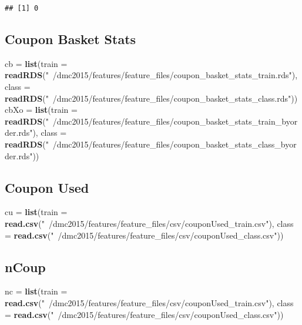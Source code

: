 \documentclass[10pt]{report}
\newenvironment{Shaded}{}{}
\newcommand{\KeywordTok}[1]{\textcolor[rgb]{0.00,0.44,0.13}{\textbf{{#1}}}}
\newcommand{\DataTypeTok}[1]{\textcolor[rgb]{0.56,0.13,0.00}{{#1}}}
\newcommand{\StringTok}[1]{\textcolor[rgb]{0.25,0.44,0.63}{{#1}}}
\newcommand{\NormalTok}[1]{{#1}}
\begin{document}
\begin{verbatim}
## [1] 0
\end{verbatim}

\subsection{Coupon Basket Stats}\label{coupon-basket-stats}

\begin{Shaded}
\begin{Highlighting}[]
\NormalTok{cb =}\StringTok{ }\KeywordTok{list}\NormalTok{(}\DataTypeTok{train =} \KeywordTok{readRDS}\NormalTok{(}\StringTok{"~/dmc2015/features/feature_files/coupon_basket_stats_train.rds"}\NormalTok{), }
    \DataTypeTok{class =} \KeywordTok{readRDS}\NormalTok{(}\StringTok{"~/dmc2015/features/feature_files/coupon_basket_stats_class.rds"}\NormalTok{))}
\NormalTok{cbXo =}\StringTok{ }\KeywordTok{list}\NormalTok{(}\DataTypeTok{train =} \KeywordTok{readRDS}\NormalTok{(}\StringTok{"~/dmc2015/features/feature_files/coupon_basket_stats_train_byorder.rds"}\NormalTok{), }
    \DataTypeTok{class =} \KeywordTok{readRDS}\NormalTok{(}\StringTok{"~/dmc2015/features/feature_files/coupon_basket_stats_class_byorder.rds"}\NormalTok{))}
\end{Highlighting}
\end{Shaded}

\subsection{Coupon Used}\label{coupon-used}

\begin{Shaded}
\begin{Highlighting}[]
\NormalTok{cu =}\StringTok{ }\KeywordTok{list}\NormalTok{(}\DataTypeTok{train =} \KeywordTok{read.csv}\NormalTok{(}\StringTok{"~/dmc2015/features/feature_files/csv/couponUsed_train.csv"}\NormalTok{), }
    \DataTypeTok{class =} \KeywordTok{read.csv}\NormalTok{(}\StringTok{"~/dmc2015/features/feature_files/csv/couponUsed_class.csv"}\NormalTok{))}
\end{Highlighting}
\end{Shaded}

\subsection{nCoup}\label{ncoup}

\begin{Shaded}
\begin{Highlighting}[]
\NormalTok{nc =}\StringTok{ }\KeywordTok{list}\NormalTok{(}\DataTypeTok{train =} \KeywordTok{read.csv}\NormalTok{(}\StringTok{"~/dmc2015/features/feature_files/csv/couponUsed_train.csv"}\NormalTok{), }
    \DataTypeTok{class =} \KeywordTok{read.csv}\NormalTok{(}\StringTok{"~/dmc2015/features/feature_files/csv/couponUsed_class.csv"}\NormalTok{))}
\end{Highlighting}
\end{Shaded}
\end{document}
